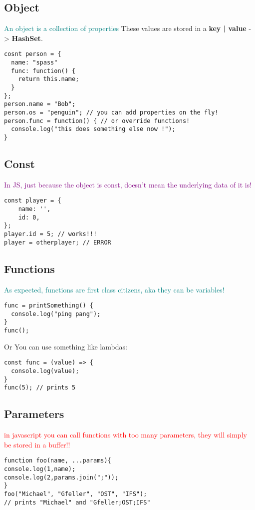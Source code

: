 \documentclass[main.tex,fontsize=6pt,paper=a4,paper=landscape,DIV=calc,]{scrartcl}
\begin{document}
\begin{multicols*}{4}
\subsection{Object}  
\textcolor{teal}{An object is a collection of properties}\newline
These values are stored in a \textbf{key | value} -> \textbf{HashSet}.
\vspace{-2mm}
\begin{lstlisting}
cosnt person = {
  name: "spass"
  func: function() {
    return this.name;
  }
};
person.name = "Bob";
person.os = "penguin"; // you can add properties on the fly!
person.func = function() { // or override functions!
  console.log("this does something else now !");
}
\end{lstlisting}
\vspace{2mm}

\subsection{Const}
\textcolor{purple}{In JS, just because the object is const, doesn't mean the underlying data of it is!}
\vspace{-2mm}
\begin{lstlisting}
const player = {
    name: '',
    id: 0,
};
player.id = 5; // works!!!
player = otherplayer; // ERROR
\end{lstlisting}
\vspace{2mm}

\subsection{Functions} 
\textcolor{teal}{As expected, functions are first class citizens, aka they can be variables!}
\vspace{-2mm}
\begin{lstlisting}
func = printSomething() {
  console.log("ping pang");
}
func();
\end{lstlisting}
\vspace{2mm}
Or You can use something like lambdas:
\vspace{-2mm}
\begin{lstlisting}
const func = (value) => {
  console.log(value);
}
func(5); // prints 5
\end{lstlisting}
\vspace{2mm}

\subsection{Parameters}  
\textcolor{red}{in javascript you can call functions with too many parameters, they will simply be stored in a buffer!!}
\vspace{-2mm}
\begin{lstlisting}
function foo(name, ...params){
console.log(1,name);
console.log(2,params.join(";"));
}
foo("Michael", "Gfeller", "OST", "IFS");
// prints "Michael" and "Gfeller;OST;IFS"
\end{lstlisting}
\vspace{2mm}


\end{multicols*}
\end{document}
